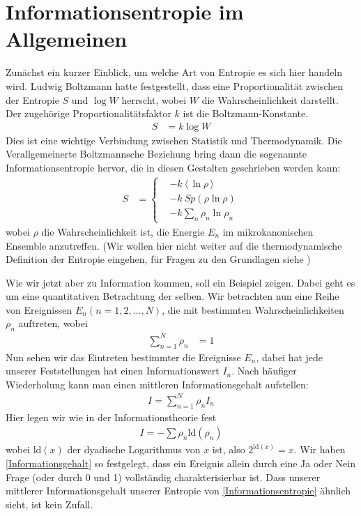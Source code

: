 \documentclass[ngerman]{scrartcl}
\newcommand{\erw}[1]{\langle {#1} \rangle}
\begin{document}
\section{Informationsentropie im Allgemeinen \checkmark} \label{InfoentropieAllg}
Zunächst ein kurzer Einblick, um welche Art von Entropie es sich hier handeln wird. Ludwig Boltzmann hatte festgestellt, dass eine Proportionalität zwischen der Entropie $S$ und $\log W$ herrscht, wobei $W$ die Wahrscheinlichkeit darstellt. Der zugehörige Proportionalitätsfaktor $k$ ist die Boltzmann-Konstante.
	\begin{align}
		S &= k \log W
	\end{align}
Dies ist eine wichtige Verbindung zwischen Statistik und Thermodynamik. 
Die Verallgemeinerte Boltzmannsche Beziehung bring dann die sogenannte Informationsentropie hervor, die in diesen Gestalten geschrieben werden kann:	
	\begin{align} \label{Informationsentropie}
		S &=
		\left\{
		\begin{aligned}
		&- k ~\erw{\,\ln \rho\,} \\
		&-k~ Sp(\rho \ln \rho) \\
		&-k \sum_n \rho_n \ln \rho_n
		\end{aligned}
		\right.
	\end{align}
wobei $\rho$ die Wahrscheinlichkeit ist, die Energie $E_n$ im mikrokanonischen Ensemble anzutreffen. 
(Wir wollen hier nicht weiter auf die thermodynamische Definition der Entropie eingehen, für Fragen zu den Grundlagen siehe \cite{Brenig})

Wie wir jetzt aber zu Information kommen, soll ein Beispiel zeigen. Dabei geht es um eine quantitativen Betrachtung der selben.
Wir betrachten nun eine Reihe von Ereignissen $E_n (n = 1, 2, \ldots, N)$, die mit bestimmten Wahrscheinlichkeiten $\rho_n$ auftreten, wobei
	\begin{align*}
		\sum_{n=1}^N \rho_n &= 1
	\end{align*}
Nun sehen wir das Eintreten bestimmter die Ereignisse $E_n$, dabei hat jede unserer Feststellungen hat einen Informationswert $I_n$. Nach häufiger Wiederholung kann man einen mittleren Informationsgehalt aufstellen:
	\begin{align*}
		I = \sum_{n=1}^N \rho_n I_n
	\end{align*}
Hier legen wir wie in der Informationstheorie fest
	\begin{align*} \label{Informationsgehalt}
		I = - \sum \rho_n \mathrm{ld}(\rho_n)
	\end{align*}
wobei $\mathrm{ld}(x)$ der dyadische Logarithmus von $x$ ist, also $2^{\mathrm{ld}(x)} = x$. 
Wir haben \eqref{Informationsgehalt} so festgelegt, dass ein Ereignis allein durch eine Ja oder Nein Frage (oder durch 0 und 1) vollständig charakterisierbar ist. 
Dass unserer mittlerer Informationsgehalt unserer Entropie von \eqref{Informationsentropie} ähnlich sieht, ist kein Zufall.
\end{document}
